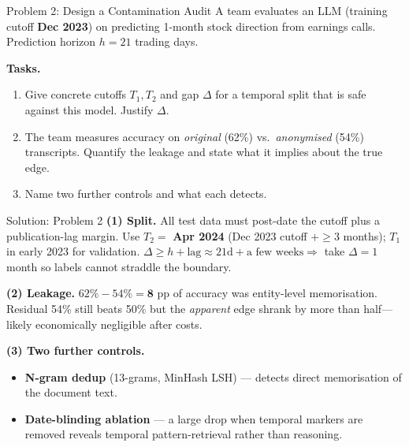 \documentclass[9pt,t]{beamer}
\begin{document}
\begin{frame}{Problem 2: Design a Contamination Audit}
A team evaluates an LLM (training cutoff \textbf{Dec 2023}) on predicting 1-month
stock direction from earnings calls. Prediction horizon $h = 21$ trading days.

\medskip
\textbf{Tasks.}
\begin{enumerate}
  \item Give concrete cutoffs $T_1, T_2$ and gap $\Delta$ for a temporal split that
        is safe against this model. Justify $\Delta$.
  \item The team measures accuracy on \emph{original} (62\%) vs.\
        \emph{anonymised} (54\%) transcripts. Quantify the leakage and state what
        it implies about the true edge.
  \item Name two further controls and what each detects.
\end{enumerate}
\end{frame}

\begin{frame}{Solution: Problem 2}
\textbf{(1) Split.} All test data must post-date the cutoff plus a publication-lag
margin. Use $T_2 = $ \textbf{Apr 2024} (Dec 2023 cutoff $+ \geq 3$ months);
$T_1$ in early 2023 for validation. $\Delta \geq h + \text{lag} \approx
21\text{d} + \text{a few weeks} \Rightarrow$ take $\Delta = 1$ month so labels
cannot straddle the boundary.

\medskip
\textbf{(2) Leakage.} $62\% - 54\% = \mathbf{8}$ pp of accuracy was
entity-level memorisation. Residual 54\% still beats 50\% but the \emph{apparent}
edge shrank by more than half---likely economically negligible after costs.

\medskip
\textbf{(3) Two further controls.}
\begin{itemize}
  \item \textbf{N-gram dedup} (13-grams, MinHash LSH) --- detects direct
        memorisation of the document text.
  \item \textbf{Date-blinding ablation} --- a large drop when temporal markers are
        removed reveals temporal pattern-retrieval rather than reasoning.
\end{itemize}
\end{frame}
\end{document}
